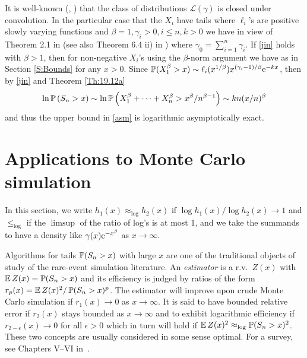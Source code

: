 	It is well-known (\cite{cline1986convolution}, \cite{watanabe2008convolution}) that the class of distributions  $\mathcal{L}(\gamma)$ is closed under convolution.  In the particular case that the $X_i$ have tails
	where $\ell_i$'s are  positive slowly varying functions and $\beta=1, \gamma_i>0, i\le n,k>0$ we have in view of
	Theorem 2.1 in \cite{hashorva2014asymptotics} (see also Theorem 6.4 ii) in \cite{adler2017relative})
	where $\gamma_0=\sum_{i=1}^n \gamma_i$.
	If \eqref{jin} holds with $\beta>1$, then for non-negative $X_i$'s using the $\beta$-norm argument we have as in Section \ref{S:Bounds}
	for any $x>0$. Since $\mathbb{P}( X_1^{\beta}> x) \sim \ell_i(x^{1/\beta}) x^{(\gamma_i- 1)/\beta} \mathrm{e}^{- k x}$, then by \eqref{jin} and Theorem \ref{Th:19.12a}
	$$\ln \mathbb{P} \left( S_n> x \right) \sim   \ln  \mathbb{P} \left(  X_1^{\beta}+ \cdots +X_n^{\beta} > x^\beta /n^{\beta-1} \right)  \sim  k n (x/n)^{\beta}  $$
and thus the upper bound in \eqref{asm} is logarithmic asymptotically exact.

\section{Applications to Monte Carlo simulation}\label{S:CdMC}

In this section, we write $h_1(x)\approx_{\log}h_2(x)$ if $\log h_1(x)/\log h_2(x)\to 1$
and $ \le_{\log}$ if the $\limsup$ of the ratio of log's is at most 1, and we take the summands 
to have a density like $\gamma(x) \mathrm{e}^{-x^\beta}$ as $x \to \infty$.  

Algorithms for tails $\operatorname{{\mathbb P}}(S_n > x)$ with large $x$ are one of the traditional objects
of study of the rare-event simulation literature.  
An \emph{estimator} is a r.v.\ $Z(x)$ with $\operatorname{{\mathbb E}} Z(x)=\operatorname{{\mathbb P}}(S_n > x)$ and its efficiency
is judged by ratios of the form $r_p(x)=\operatorname{{\mathbb E}} Z(x)^2/\operatorname{{\mathbb P}}(S_n > x)^p$. The
estimator will improve upon crude Monte Carlo simulation if $r_1(x)\to 0$ as $x\to\infty$. It is said to have bounded relative error if $r_2(x) $ stays bounded as $x\to\infty$ and to
exhibit logarithmic efficiency if $r_{2-\epsilon}(x)\to 0$ for all $\epsilon>0$ which in turn
will hold if $\operatorname{{\mathbb E}} Z(x)^2\approx_{\log} \operatorname{{\mathbb P}}(S_n > x)^2$. These two concepts are
usually considered in some sense optimal. For a survey, see Chapters 
V--VI in~\cite{asmussen2007stochastic}.

